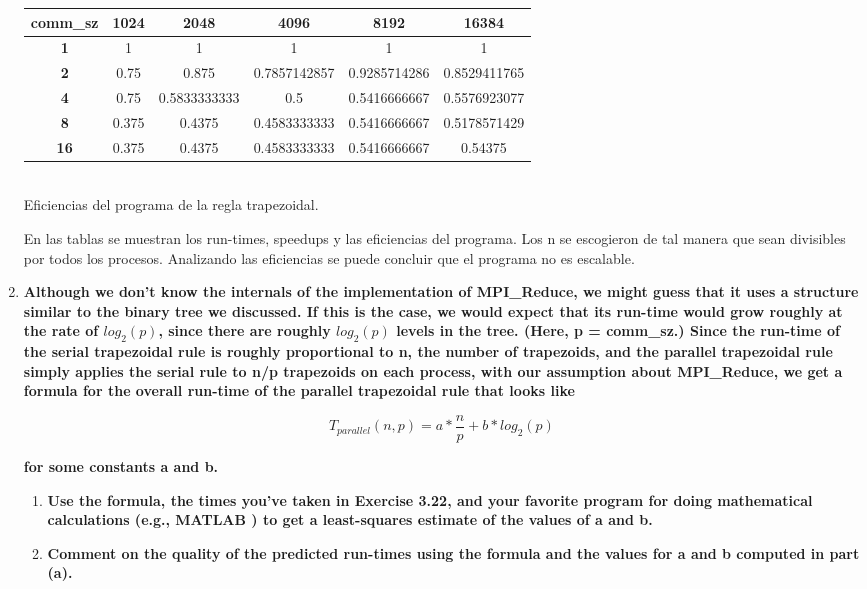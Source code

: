 \documentclass[a4paper,12pt]{article}
\begin{document}
\begin{enumerate}
\begin{center}
\begin{tabular}{|c|c|c|c|c|c|}\hline
\textbf{comm\_sz} & \textbf{1024} & \textbf{2048} & \textbf{4096} & \textbf{8192} & \textbf{16384}\\\hline
\textbf{1} & 1 & 1 & 1 & 1 & 1\\\hline
\textbf{2} & 0.75 & 0.875 & 0.7857142857 & 0.9285714286 & 0.8529411765\\\hline
\textbf{4} & 0.75 & 0.5833333333 & 0.5 & 0.5416666667 & 0.5576923077\\\hline
\textbf{8} & 0.375 & 0.4375 & 0.4583333333 & 0.5416666667 & 0.5178571429\\\hline
\textbf{16} & 0.375 & 0.4375 & 0.4583333333 & 0.5416666667 & 0.54375\\\hline
\end{tabular}
\\
Eficiencias del programa de la regla trapezoidal.
\end{center}

En las tablas se muestran los run-times, speedups y las eficiencias del programa. Los n se escogieron de tal
manera que sean divisibles por todos los procesos. Analizando las eficiencias se puede concluir que el
programa no es escalable.

\item {\textbf{Although we don’t know the internals of the implementation of MPI\_Reduce, we might guess
that it uses a structure similar to the binary tree we discussed. If this is the case, we would expect
that its run-time would grow roughly at the rate of $log_{2}(p)$, since there are roughly $log_{2}(p)$ 
levels in the tree. (Here, p = comm\_sz.) Since the run-time of the serial trapezoidal rule is roughly
proportional to n, the number of trapezoids, and the parallel trapezoidal rule simply applies the serial
rule to n/p trapezoids on each process, with our assumption about MPI\_Reduce, we get a formula for the
overall run-time of the parallel trapezoidal rule that looks like}

$$T_{parallel}(n,p)=a*\frac{n}{p}+b*log_{2}(p)$$

\textbf{for some constants a and b.}
\begin{enumerate}
 \item \textbf{Use the formula, the times you’ve taken in Exercise 3.22, and your favorite program for
 doing mathematical calculations (e.g., MATLAB ) to get a least-squares estimate of the values of a and b.}
 \item \textbf{Comment on the quality of the predicted run-times using the formula and the values for a 
 and b computed in part (a).}
\end{enumerate}
}


\end{enumerate}
\end{document}
